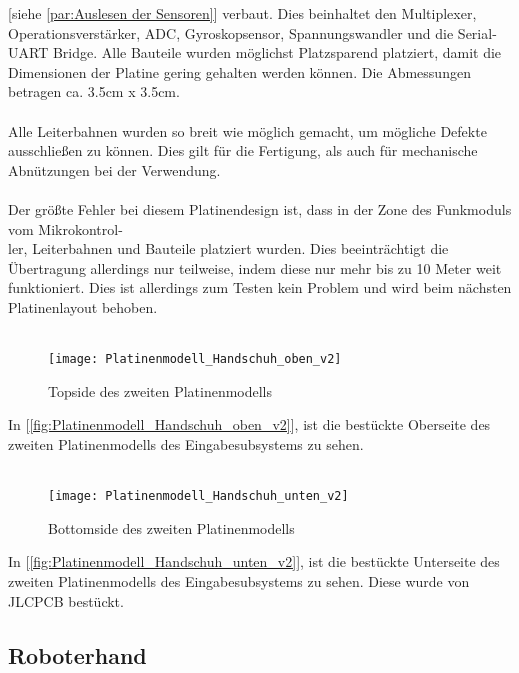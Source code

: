 \documentclass[titlepage,12pt,twoside]{article}
\begin{document}
[siehe \textcolor{blue}{\autoref{par:Auslesen der Sensoren}}] verbaut. Dies beinhaltet den Multiplexer, Operationsverstärker, ADC, Gyroskopsensor, Spannungswandler
und die Serial-UART Bridge. Alle Bauteile wurden möglichst Platzsparend platziert, damit die Dimensionen der Platine gering gehalten werden können.
Die Abmessungen betragen ca. 3.5cm x 3.5cm. \\
\\
Alle Leiterbahnen wurden so breit wie möglich gemacht, um mögliche Defekte ausschließen zu können. Dies gilt für die Fertigung, als auch für mechanische
Abnützungen bei der Verwendung. \\
\\
Der größte Fehler bei diesem Platinendesign ist, dass in der Zone des Funkmoduls vom Mikrokontrol-\\ler, Leiterbahnen und Bauteile platziert wurden.
Dies beeinträchtigt die Übertragung allerdings nur teilweise, indem diese nur mehr bis zu 10 Meter weit funktioniert. Dies ist allerdings zum Testen
kein Problem und wird beim nächsten Platinenlayout behoben. \\
\\
\begin{figure}[H]
	\begin{center}
		\scalebox{0.55}
		{\texttt{[image: Platinenmodell\_Handschuh\_oben\_v2]}}
		\caption{Topside des zweiten Platinenmodells}
		\label{fig:Platinenmodell_Handschuh_oben_v2}		
	\end{center}
\end{figure}
\hfill \break
In [\textcolor{blue}{\autoref{fig:Platinenmodell_Handschuh_oben_v2}}], ist die bestückte Oberseite des zweiten Platinenmodells des Eingabesubsystems zu sehen. \\
\\
\begin{figure}[H]
	\begin{center}
		\scalebox{0.55}
		{\texttt{[image: Platinenmodell\_Handschuh\_unten\_v2]}}
		\caption{Bottomside des zweiten Platinenmodells}
		\label{fig:Platinenmodell_Handschuh_unten_v2}		
	\end{center}
\end{figure}
\hfill \break
In [\textcolor{blue}{\autoref{fig:Platinenmodell_Handschuh_unten_v2}}], ist die bestückte Unterseite des zweiten Platinenmodells des Eingabesubsystems zu sehen. Diese wurde von JLCPCB bestückt. \\

\subsection{Roboterhand}
\end{document}
